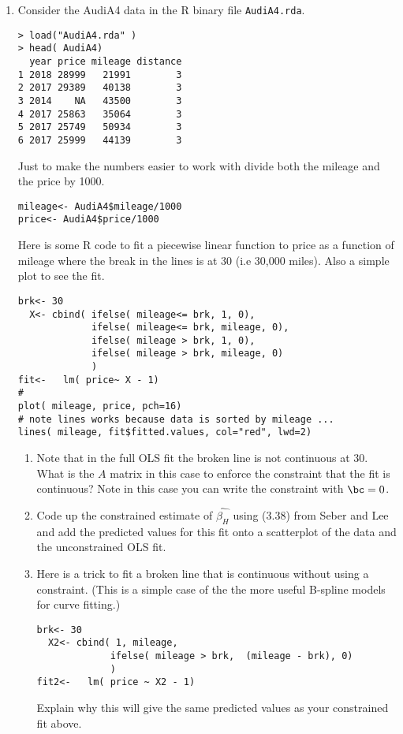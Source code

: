 \documentclass[10pt]{report}
\begin{document}
\begin{enumerate}
\item 
Consider the AudiA4 data in the R binary file {\tt AudiA4.rda}.

\begin{verbatim}
> load("AudiA4.rda" )
> head( AudiA4)
  year price mileage distance
1 2018 28999   21991        3
2 2017 29389   40138        3
3 2014    NA   43500        3
4 2017 25863   35064        3
5 2017 25749   50934        3
6 2017 25999   44139        3
\end{verbatim}
Just to make the numbers easier to work with divide both the mileage and the price by 1000. 

\begin{verbatim}
mileage<- AudiA4$mileage/1000
price<- AudiA4$price/1000
\end{verbatim}

Here is some R code to fit a piecewise linear function to price as a function of mileage where the break in the lines is at 30 (i.e 30,000  miles).  Also a simple plot to see the fit. 
\begin{verbatim}
brk<- 30 
  X<- cbind( ifelse( mileage<= brk, 1, 0),
             ifelse( mileage<= brk, mileage, 0),
             ifelse( mileage > brk, 1, 0),
             ifelse( mileage > brk, mileage, 0)
             )
fit<-   lm( price~ X - 1)
#
plot( mileage, price, pch=16)
# note lines works because data is sorted by mileage ...
lines( mileage, fit$fitted.values, col="red", lwd=2)
\end{verbatim}

 \begin{enumerate}
 \item  Note that in the full OLS fit the broken line is not continuous at 30. 
  What is the $A$ matrix in this case to enforce the constraint that the fit is continuous?
  Note in this case you can write the constraint with $\bc = 0$.
 \item  Code up the constrained estimate of $\hat{\beta_H}$ using  (3.38) from Seber and Lee and  add the predicted values for this fit onto a scatterplot of the data and the unconstrained OLS fit. 
 
 \item  Here is a trick to fit a broken line that is continuous without using a constraint. (This is a simple case of the the more useful B-spline models for curve fitting.)
 \begin{verbatim}
brk<- 30 
  X2<- cbind( 1, mileage,
             ifelse( mileage > brk,  (mileage - brk), 0)
             )
fit2<-   lm( price ~ X2 - 1)  
\end{verbatim}
Explain why this will give the same predicted values as your constrained fit above.

\end{enumerate}

 \end{enumerate}
 
\end{document}
